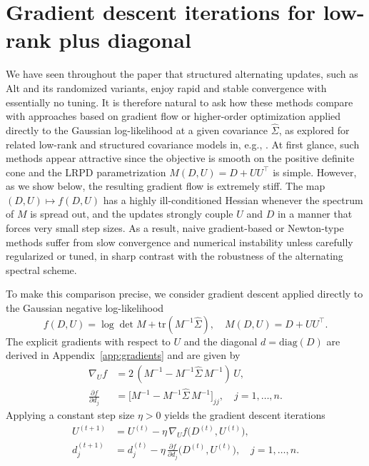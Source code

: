 \documentclass[final,hidelinks,onefignum,onetabnum]{siamart250211}
\providecommand{\1}{\mathbf{1}}
\theoremstyle{plain}
\begin{document}


\section{Gradient descent iterations for low-rank plus diagonal}

We have seen throughout the paper that structured alternating updates, such as Alt and its
randomized variants, enjoy rapid and stable convergence with essentially no tuning. It is therefore
natural to ask how these methods compare with approaches based on gradient flow or higher-order
optimization applied directly to the Gaussian log-likelihood at a given covariance
$\widehat{\Sigma}$, as explored for related low-rank and structured covariance models in, e.g.,
\cite{lawley1940estimation, anderson2003introduction, saunderson2012diagonal, sun2016majorization, zhou2022covariance}.
At first glance, such methods appear attractive since the objective is smooth on the positive
definite cone and the LRPD parametrization $M(D,U)=D+UU^\top$ is simple. However, as we show below,
the resulting gradient flow is extremely stiff. The map $(D,U)\mapsto f(D,U)$ has a highly
ill-conditioned Hessian whenever the spectrum of $M$ is spread out, and the updates strongly couple
$U$ and $D$ in a manner that forces very small step sizes. As a result, naive gradient-based or
Newton-type methods suffer from slow convergence and numerical instability unless carefully
regularized or tuned, in sharp contrast with the robustness of the alternating spectral scheme.

To make this comparison precise, we consider gradient descent applied directly to the Gaussian
negative log-likelihood
\[
f(D,U) = \log\det M + \mathrm{tr}(M^{-1}\widehat\Sigma),
\quad M(D,U)=D+UU^\top.
\]
The explicit gradients with respect to $U$ and the diagonal $d=\mathrm{diag}(D)$ are derived in
Appendix~\ref{app:gradients} and are given by
\begin{align}
\nabla_U f &= 2\,(M^{-1}-M^{-1}\widehat\Sigma\,M^{-1})\,U, \label{eq:gradientU_main} \\
\frac{\partial f}{\partial d_j} &= \bigl[M^{-1}-M^{-1}\widehat\Sigma\,M^{-1}\bigr]_{jj},
\quad j=1,\ldots,n. \label{eq:gradientdiag_main}
\end{align}
Applying a constant step size $\eta>0$ yields the gradient descent iterations
\begin{align*}
U^{(t+1)} &= U^{(t)} - \eta\,\nabla_U f\bigl(D^{(t)},U^{(t)}\bigr), \\
d^{(t+1)}_j &= d^{(t)}_j - \eta\,\frac{\partial f}{\partial d_j}
\bigl(D^{(t)},U^{(t)}\bigr), \quad j=1,\ldots,n.
\end{align*}
\end{document}
